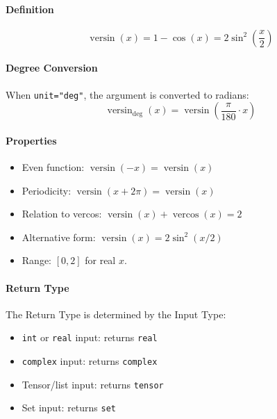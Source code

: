 \paragraph{Definition}
\[
\operatorname{versin}(x) = 1 - \cos(x) = 2\sin^2\left(\frac{x}{2}\right)
\]

\paragraph{Degree Conversion}
When \texttt{unit="deg"}, the argument is converted to radians:
\[
\operatorname{versin}_{\text{deg}}(x) = \operatorname{versin}\left(\frac{\pi}{180} \cdot x\right)
\]

\paragraph{Properties}
\begin{itemize}
\item Even function: $\operatorname{versin}(-x) = \operatorname{versin}(x)$
\item Periodicity: $\operatorname{versin}(x + 2\pi) = \operatorname{versin}(x)$
\item Relation to vercos: $\operatorname{versin}(x) + \operatorname{vercos}(x) = 2$
\item Alternative form: $\operatorname{versin}(x) = 2\sin^2(x/2)$
\item Range: $[0, 2]$ for real $x$.
\end{itemize}

\paragraph{Return Type}
The Return Type is determined by the Input Type:
\begin{itemize}
\item \texttt{int} or \texttt{real} input: returns \texttt{real}
\item \texttt{complex} input: returns \texttt{complex}
\item Tensor/list input: returns \texttt{tensor}
\item Set input: returns \texttt{set}
\end{itemize}

